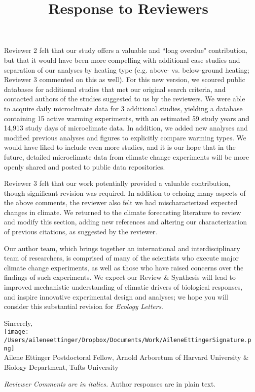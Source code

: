 \documentclass[11pt,a4paper]{letter}
\begin{document}
\begin{letter}{}
Reviewer 2 felt that our study offers a valuable and ``long overdue" contribution, but that it would have been more compelling with additional case studies and separation of our analyses by heating type (e.g. above- vs. below-ground heating; Reviewer 3 commented on this as well). For this new version, we scoured public databases for additional studies that met our original search criteria, and contacted authors of the studies suggested to us by the reviewers. We were able to acquire daily microclimate data for 3 additional studies, yielding a database containing 15 active warming experiments, with an estimated 59 study years and 14,913 study days of microclimate data. In addition, we added new analyses and modified previous analyses and figures to explicitly compare warming types.  We would have liked to include even more studies, and it is our hope that in the future, detailed microclimate data from climate change experiments will be more openly shared and posted to public data repositories. 

Reviewer 3 felt that our work potentially provided a valuable contribution, though significant revision was required.  In addition to echoing many aspects of the above comments, the reviewer also felt we had mischaracterized expected changes in climate. We returned to the climate forecasting literature to review and modify this section, adding new references and altering our characterization of previous citations, as suggested by the reviewer. 

Our author team, which brings together an international and interdisciplinary team of researchers, is comprised of many of the scientists who execute major climate change experiments, as well as those who have raised concerns over the findings of such experiments.  We expect our Review \& Synthesis will lead to improved mechanistic understanding of climatic drivers of biological responses, and inspire innovative experimental design and analyses; we hope you will consider this substantial revision for \emph{Ecology Letters}.

Sincerely,\\

\texttt{[image: /Users/aileneettinger/Dropbox/Documents/Work/AileneEttingerSignature.png]} \\
Ailene Ettinger
Postdoctoral Fellow, Arnold Arboretum of Harvard University \& Biology Department, Tufts University


\clearpage
\title{Response to Reviewers}
 \emph{Reviewer Comments are in italics.} Author responses are in plain text.


\end{letter}
\end{document}
